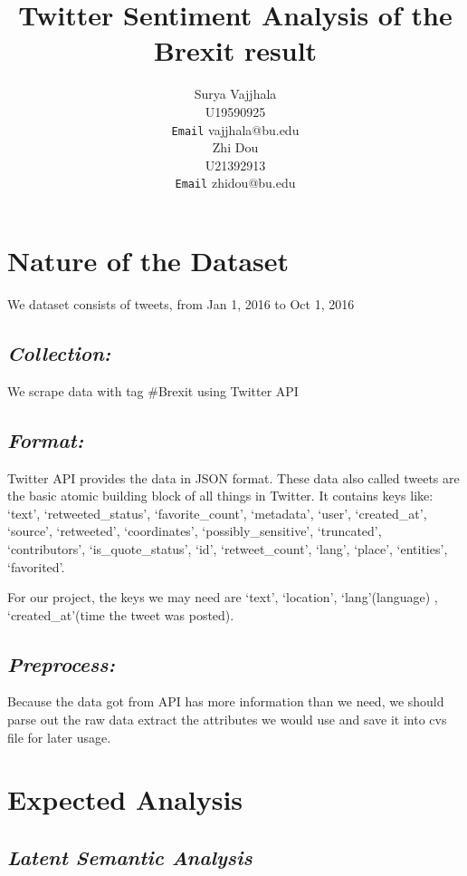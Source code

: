 \documentclass{article}
\title{Twitter Sentiment Analysis of the Brexit result}
\author{
    Surya Vajjhala \\
    U19590925\\
    \texttt{Email} vajjhala@bu.edu\\
     \And
    Zhi Dou \\
    U21392913 \\
    \texttt{Email} zhidou@bu.edu\\
}
\begin{document}

\maketitle

\section*{Nature of the Dataset}
We dataset consists of tweets, from Jan 1, 2016 to Oct 1, 2016

\subsection*{\textit{\textbf{Collection:}}}
We scrape data with tag \#Brexit using Twitter API 
\subsection*{\textit{\textbf{Format:}}} Twitter API provides the data in JSON format. These data also called tweets are the basic atomic building block of all things in Twitter. It contains keys like: \lq text\rq, \lq retweeted\_status\rq, \lq favorite\_count\rq, \lq metadata\rq, \lq user\rq, \lq created\_at\rq, \lq source\rq, \lq retweeted\rq, \lq coordinates\rq, \lq possibly\_sensitive\rq, \lq truncated\rq, \lq contributors\rq, \lq is\_quote\_status\rq, \lq id\rq, \lq retweet\_count\rq, \lq lang\rq, \lq place\rq , \lq entities\rq , \lq favorited\rq.	

\par For our project, the keys we may need are \lq text\rq, \lq location\rq, \lq lang\rq          (language) , \lq created\_at\rq (time the tweet was posted).

\subsection*{\textit{\textbf{Preprocess:}}} Because the data got from API has more information than we need, we should parse out the raw data extract the attributes we would use and save it into cvs file for later usage.


\section*{Expected Analysis}

\subsection* {\textit{\textbf{Latent Semantic Analysis}}}
\end{document}
